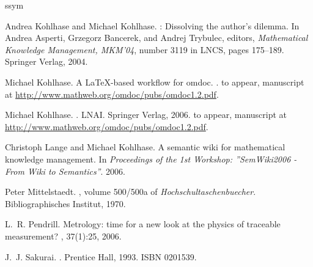 ssym\documentclass{llncs}
\def\LNCS{LNCS}
\begin{document}
\begin{thebibliography}{Koh06b}
Andrea Kohlhase and Michael Kohlhase.
: Dissolving the author's dilemma.
\newblock In Andrea Asperti, Grzegorz Bancerek, and Andrej Trybulec, editors,
  {\em Mathematical Knowledge Management, MKM'04}, number 3119 in \LNCS, pages
  175--189. Springer Verlag, 2004.

Michael Kohlhase.
\newblock A {\LaTeX}-based workflow for omdoc.
\newblock  \cite{Kohlhase:omdoc1.2}.
\newblock to appear, manuscript at
  {\url{http://www.mathweb.org/omdoc/pubs/omdoc1.2.pdf}}.

Michael Kohlhase.
.
\newblock LNAI. Springer Verlag, 2006.
\newblock to appear, manuscript at
  {\url{http://www.mathweb.org/omdoc/pubs/omdoc1.2.pdf}}.

Christoph Lange and Michael Kohlhase.
\newblock A semantic wiki for mathematical knowledge management.
\newblock In {\em Proceedings of the 1st Workshop: ''SemWiki2006 - From Wiki to
  Semantics''}. 2006.

Peter Mittelstaedt.
, volume 500/500a of {\em
  Hochschultaschenbuecher}.
\newblock Bibliographisches Institut, 1970.

L.~R. Pendrill.
\newblock Metrology: time for a new look at the physics of traceable
  measurement?
, 37(1):25, 2006.

J.~J. Sakurai.
.
\newblock Prentice Hall, 1993.
\newblock ISBN 0201539.

\end{thebibliography}

\end{document}

